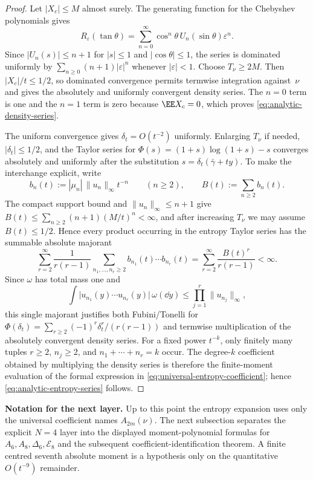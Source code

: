 \begin{proof}
Let $|X_c|\le M$ almost surely.  The generating function for the
Chebyshev polynomials gives
\[
R_\varepsilon(\tan\theta)
=\sum_{n=0}^{\infty}\cos^n\theta\,U_n(\sin\theta)\varepsilon^n.
\]
Since $|U_n(s)|\le n+1$ for $|s|\le1$ and $|\cos\theta|\le1$, the series is
dominated uniformly by $\sum_{n\ge0}(n+1)|\varepsilon|^n$ whenever
$|\varepsilon|<1$.  Choose $T_\nu\ge2M$.  Then
$|X_c|/t\le1/2$, so dominated convergence permits termwise integration
against~$\nu$ and gives the absolutely and uniformly convergent density
series.  The $n=0$ term is one and the $n=1$ term is zero because
$\EE X_c=0$, which proves \eqref{eq:analytic-density-series}.

The uniform convergence gives $\delta_t=O(t^{-2})$ uniformly.  Enlarging
$T_\nu$ if needed, $|\delta_t|\le1/2$, and the Taylor series for
$\Phi(s)=(1+s)\log(1+s)-s$ converges absolutely and uniformly after the
substitution $s=\delta_t(\bar{\gamma}+ty)$.  To make the interchange explicit,
write
\[
b_n(t):=|\mu_n|\,\|u_n\|_\infty t^{-n}
\qquad(n\ge2),
\qquad
B(t):=\sum_{n\ge2}b_n(t).
\]
The compact support bound and $\|u_n\|_\infty\le n+1$ give
$B(t)\le\sum_{n\ge2}(n+1)(M/t)^n<\infty$, and after increasing $T_\nu$ we
may assume $B(t)\le1/2$.  Hence every product occurring in the entropy Taylor
series has the summable absolute majorant
\[
\sum_{r=2}^{\infty}\frac1{r(r-1)}
\sum_{n_1,\dots,n_r\ge2}
b_{n_1}(t)\cdots b_{n_r}(t)
=\sum_{r=2}^{\infty}\frac{B(t)^r}{r(r-1)}<\infty.
\]
Since $\omega$ has total mass one and
\[
\int\bigl|u_{n_1}(y)\cdots u_{n_r}(y)\bigr|\,\omega(\dd y)
\le \prod_{j=1}^r\|u_{n_j}\|_\infty,
\]
this single majorant justifies both Fubini/Tonelli for
$\Phi(\delta_t)=\sum_{r\ge2}(-1)^r\delta_t^r/(r(r-1))$ and termwise
multiplication of the absolutely convergent density series.  For a fixed
power $t^{-k}$, only finitely many tuples $r\ge2$, $n_j\ge2$, and
$n_1+\cdots+n_r=k$ occur.  The degree-$k$ coefficient obtained by multiplying
the density series is therefore the finite-moment evaluation of the formal
expression in
\eqref{eq:universal-entropy-coefficient}; hence
\eqref{eq:analytic-entropy-series} follows.
\end{proof}

\medskip
\noindent\textbf{Notation for the next layer.}
Up to this point the entropy expansion uses only the universal coefficient
names \(A_{2m}(\nu)\).  The next subsection separates the explicit \(N=4\)
layer into the displayed moment-polynomial formulas for
\(A_6,A_8,\Delta_6,\mathcal E_8\) and the subsequent coefficient-identification
theorem.  A finite centred seventh absolute moment is a hypothesis only on
the quantitative \(O(t^{-9})\) remainder.

\endinput
